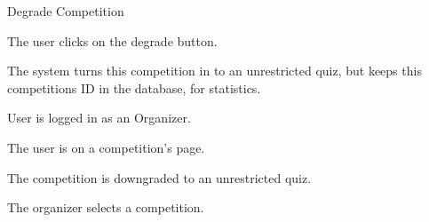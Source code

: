 
\begin{uc}{Degrade Competition}

    \begin{uc-mss}
    \item The user clicks on the degrade button.
    \item The system turns this competition in to an unrestricted quiz, but
        keeps this competitions ID in the database, for statistics.
    \end{uc-mss}

    \begin{uc-pre}
    \item User is logged in as an Organizer.
    \item The user is on a competition's page.
    \end{uc-pre}

    \begin{uc-post}
    \item The competition is downgraded to an unrestricted quiz.
    \end{uc-post}

    \begin{uc-trig}
        The organizer selects a competition.
    \end{uc-trig}

\end{uc}
